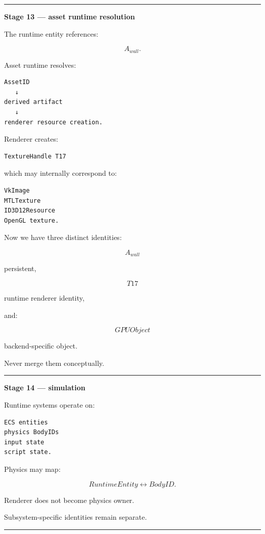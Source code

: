 \begin{center}\rule{0.5\linewidth}{0.5pt}\end{center}

\textbf{Stage 13 --- asset runtime resolution}

The runtime entity references:

\[
A_{wall}.
\]

Asset runtime resolves:

\begin{verbatim}
AssetID
   ↓
derived artifact
   ↓
renderer resource creation.
\end{verbatim}

Renderer creates:

\begin{verbatim}
TextureHandle T17
\end{verbatim}

which may internally correspond to:

\begin{verbatim}
VkImage
MTLTexture
ID3D12Resource
OpenGL texture.
\end{verbatim}

Now we have three distinct identities:

\[
A_{wall}
\]

persistent,

\[
T17
\]

runtime renderer identity,

and:

\[
GPUObject
\]

backend-specific object.

Never merge them conceptually.

\begin{center}\rule{0.5\linewidth}{0.5pt}\end{center}

\textbf{Stage 14 --- simulation}

Runtime systems operate on:

\begin{verbatim}
ECS entities
physics BodyIDs
input state
script state.
\end{verbatim}

Physics may map:

\[
RuntimeEntity
\leftrightarrow
BodyID.
\]

Renderer does not become physics owner.

Subsystem-specific identities remain separate.

\begin{center}\rule{0.5\linewidth}{0.5pt}\end{center}

